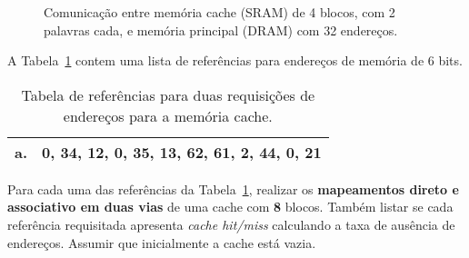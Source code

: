 \setcounter{dramaddr}{0}

\begin{figure}
\caption{Comunicação entre memória cache (SRAM) de 4 blocos, com 2 palavras
  cada, e memória principal (DRAM) com 32 endereços.}
\label{fig:mmap}
\end{figure}


A Tabela~\ref{tab:refs} contem uma lista de referências para endereços
de memória de 6 bits.

\begin{table}[h]
\centering
\begin{tabular}{|l|l|}\hline
  \bf a. & 0, 34, 12, 0, 35, 13, 62, 61, 2, 44, 0, 21 \\\hline
\end{tabular}
\caption{Tabela de referências para duas requisições de endereços para
  a memória cache.}
\label{tab:refs}
\end{table}

Para cada uma das referências da Tabela~\ref{tab:refs}, realizar os
{\bf mapeamentos direto e associativo em duas vias} de uma cache com {\bf 8}
blocos. Também listar se cada referência requisitada apresenta {\it
  cache hit/miss\/} calculando a taxa de ausência de endereços. Assumir
que inicialmente a cache está vazia.

\pagebreak

\vfill
